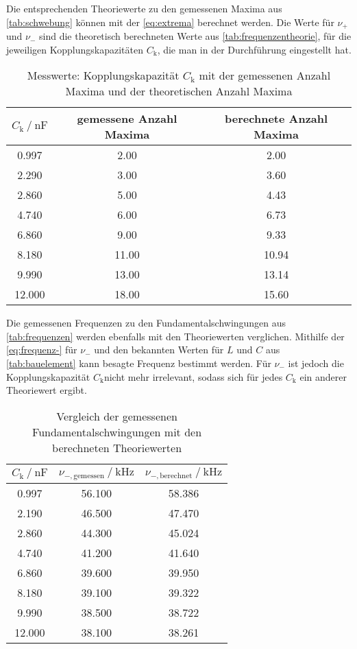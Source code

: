 Die entsprechenden Theoriewerte zu den gemessenen Maxima aus \autoref{tab:schwebung} können mit der \autoref{eq:extrema} berechnet werden. Die Werte für $\nu _+$ und $\nu _-$ sind die theoretisch berechneten Werte aus \autoref{tab:frequenzentheorie}, für die jeweiligen Kopplungskapazitäten $C_\text{k}$, die man in der Durchführung eingestellt hat. 

\begin{table}
  \centering
  \caption{Messwerte: Kopplungskapazität $C_\text{k}$ mit der gemessenen Anzahl Maxima und der theoretischen Anzahl Maxima }
  \label{tab:schwebungstheorie}
  \begin{tabular}{c c c}
    \toprule 
    $C_\text{k} \:/\: \si{\nano\farad}$ & gemessene Anzahl Maxima & berechnete Anzahl Maxima \\ 
    \midrule 
    0.997 & 2.00 & 2.00 \\
    2.290 & 3.00 & 3.60 \\
    2.860 & 5.00 & 4.43 \\
    4.740 & 6.00 & 6.73 \\
    6.860 & 9.00 & 9.33 \\
    8.180 & 11.00 & 10.94 \\
    9.990 & 13.00 & 13.14 \\
    12.000 & 18.00 & 15.60 \\
    \bottomrule
  \end{tabular}
\end{table}

Die gemessenen Frequenzen zu den Fundamentalschwingungen aus \autoref{tab:frequenzen} werden ebenfalls mit den Theoriewerten verglichen. Mithilfe der \autoref{eq:frequenz-} für $\nu _-$ und den bekannten Werten für $L$ und $C$ aus \autoref{tab:bauelement} kann besagte Frequenz bestimmt werden. Für $\nu_-$ ist jedoch die Kopplungskapazität $C_\text{k}$nicht mehr irrelevant, sodass sich für jedes $C_\text{k}$ ein anderer Theoriewert ergibt.

\begin{table}
  \centering
  \caption{Vergleich der gemessenen Fundamentalschwingungen mit den berechneten Theoriewerten}
  \label{tab:frequenzentheorie}
  \begin{tabular}{c c c}
    \toprule 
    $C_\text{k} \:/\: \si{\nano\farad}$ & $\nu _{-,\text{gemessen}} \:/\: \si{\kilo\hertz}$ & $\nu _{-,\text{berechnet}} \:/\: \si{\kilo\hertz}$    \\ 
    \midrule 
    0.997 & 56.100 & 58.386 \\
    2.190 & 46.500 & 47.470 \\
    2.860 & 44.300 & 45.024 \\
    4.740 & 41.200 & 41.640 \\
    6.860 & 39.600 & 39.950 \\
    8.180 & 39.100 & 39.322 \\
    9.990 & 38.500 & 38.722 \\
    12.000 & 38.100 & 38.261 \\
    \bottomrule
  \end{tabular}
\end{table}

